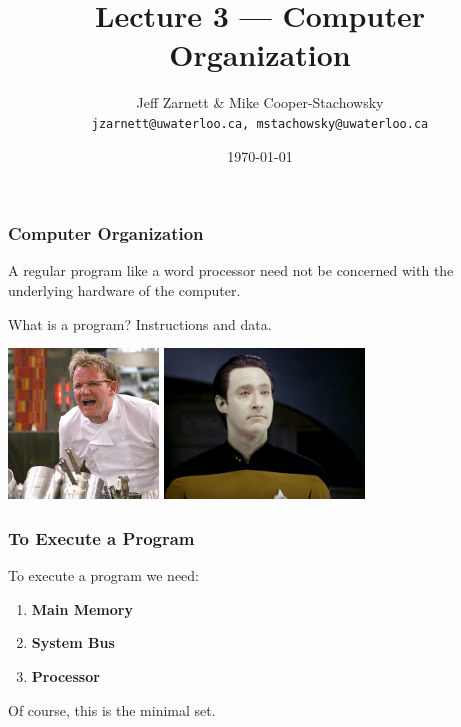 

\title{Lecture 3 --- Computer Organization}

\author{Jeff Zarnett \& Mike Cooper-Stachowsky \\ \small \texttt{jzarnett@uwaterloo.ca, mstachowsky@uwaterloo.ca}}
\date{\today}




\begin{frame}
  \titlepage

 \end{frame}

\begin{frame}
\frametitle{Computer Organization}

A regular program like a word processor need not be concerned with the underlying hardware of the computer.

What is a program? Instructions and data.
\begin{center}
	\includegraphics[width=0.3\textwidth]{images/instructions.jpg}
	\includegraphics[width=0.4\textwidth]{images/data.jpg}
\end{center}


\end{frame}

\begin{frame}
\frametitle{To Execute a Program}

To execute a program we need:

\begin{enumerate}
	\item \textbf{Main Memory}
	\item \textbf{System Bus}
	\item \textbf{Processor}
\end{enumerate}

Of course, this is the minimal set.

\end{frame}

